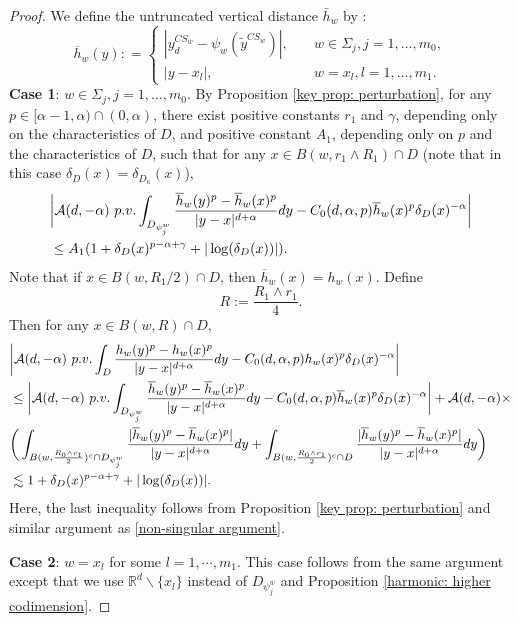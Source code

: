 \documentclass[12pt,a4paper]{amsart}
\numberwithin{equation}{section}
\theoremstyle{plain}
\newcommand{\ga}{\gamma}
\newcommand{\Si}{\Sigma}
\newcommand{\mb}{\mathbb}
\newcommand{\wt}{\widetilde}
\newcommand{\1}{\mathbbm{1}}
\begin{document}
\begin{proof}
We define the untruncated vertical distance $\bar{h}_w$ by :
\begin{equation}
\overline{h}_w(y): = 
\begin{cases}
|y_d^{CS_{w}} - \psi_w(\wt y^{CS_{w}})|, & \quad w \in \Si_j, j=1, \dots, m_0,\\
|y - x_l|, & \quad w= x_l, l=1, \dots, m_1.
\end{cases}
\end{equation}
\textbf{Case 1}: $w \in \Si_j, j=1, \dots, m_0$. 
By Proposition \ref{key prop: perturbation}, for any $p \in [\alpha - 1, \alpha) \cap (0, \alpha)$, there exist positive constants 
$r_1$ and $\ga$, depending only on the characteristics of $D$, and positive constant $A_1$, depending only on $p$ and the characteristics of $D$,
such that for any $x \in B(w,r_1\wedge R_1) \cap D$ (note that in this case $\delta_D(x) = \delta_{D_\kappa}(x)$),
\begin{align*}
& \bigg|\mathcal{A}(d,-\alpha){\ \rm p.v.}\int_{D_{\psi_j^w}} \frac{\overline{h}_w(y)^{p}-\overline{h}_w(x)^{p}}{|y-x|^{d+\alpha}}dy - C_0(d,\alpha, p) \overline{h}_w(x)^p \delta_{D}(x)^{- \alpha}\bigg| \\
&\le A_1(1+ \delta_{D}(x)^{p-\alpha+\gamma} + |\log(\delta_{D}(x))|).
\end{align*}
Note that if  $x \in B(w,R_1/2)\cap D$, then $\overline{h}_w(x) = h_w(x)$. 
Define $$R:= \frac{R_1\wedge r_1}{4}.$$
Then for any $x \in B(w,R)\cap D$,
\begin{align*}
& \bigg|\mathcal{A}(d,-\alpha){\ \rm p.v.}\int_{D} \frac{h_w(y)^{p}-h_w(x)^{p}}{|y-x|^{d+\alpha}}dy - C_0(d,\alpha,p) h_w(x)^p \delta_{D}(x)^{- \alpha}\bigg| \\
& \le \bigg|\mathcal{A}(d,-\alpha){\ \rm p.v.}\int_{D_{\psi_j^w}} \frac{\overline h_w(y)^{p}-\overline h_w(x)^{p}}{|y-x|^{d+\alpha}}dy - C_0(d,\alpha,p) \overline h_w(x)^p \delta_{D}(x)^{- \alpha}\bigg| + \mathcal{A}(d,-\alpha) \times \\
& \bigg( \int_{B(w,\frac{R_0 \wedge r_1}{2})^c \cap D_{\psi_j^w}} \frac{|\overline h_w(y)^{p}-\overline h_w(x)^{p}|}{|y-x|^{d+\alpha}}dy + \int_{B(w,\frac{R_0 \wedge r_1}{2})^c\cap D} \frac{|\overline h_w(y)^{p}-\overline h_w(x)^{p}|}{|y-x|^{d+\alpha}}dy \bigg) \\
& \lesssim 1+ \delta_D(x)^{p-\alpha +\gamma} + |\log (\delta_D(x))|.
\end{align*}
Here, the last inequality follows from Proposition \ref{key prop: perturbation} and similar argument as \eqref{non-singular argument}. 

\noindent \textbf{Case 2}: $w = x_l$ for some $l = 1,\cdots,m_1$. This case follows from the same argument except that we use $\mb R^d \backslash \{x_l\}$ instead of $D_{\psi_j^w}$ and Proposition \ref{harmonic: higher codimension}.
\end{proof}
\end{document}
